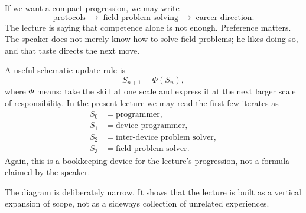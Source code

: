 If we want a compact progression, we may write
\begin{equation}
\text{protocols}
\;\to\;
\text{field problem-solving}
\;\to\;
\text{career direction}.
\end{equation}
The lecture is saying that competence alone is not enough. Preference matters. The speaker does not merely know how to solve field problems; he likes doing so, and that taste directs the next move.

A useful schematic update rule is
\begin{equation}
S_{n+1} = \Phi(S_n),
\end{equation}
where \(\Phi\) means: take the skill at one scale and express it at the next larger scale of responsibility. In the present lecture we may read the first few iterates as
\begin{align}
S_0 &= \text{programmer}, \\
S_1 &= \text{device programmer}, \\
S_2 &= \text{inter-device problem solver}, \\
S_3 &= \text{field problem solver}.
\end{align}
Again, this is a bookkeeping device for the lecture's progression, not a formula claimed by the speaker.

\begin{figure}
\centering
{}
\end{figure}

The diagram is deliberately narrow. It shows that the lecture is built as a vertical expansion of scope, not as a sideways collection of unrelated experiences.

